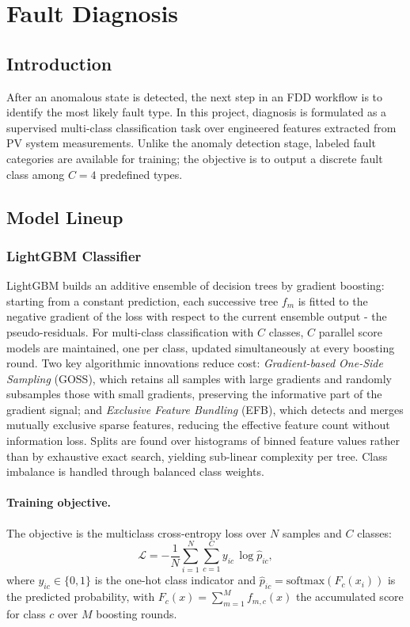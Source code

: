 \section{Fault Diagnosis}\label{sec:fault-diagnosis}

\subsection{Introduction}
After an anomalous state is detected, the next step in an FDD workflow is to identify the most likely fault type. In this project, diagnosis is formulated as a supervised multi-class classification task over engineered features extracted from PV system measurements. Unlike the anomaly detection stage, labeled fault categories are available for training; the objective is to output a discrete fault class among $C=4$ predefined types.


\subsection{Model Lineup}

\subsubsection{LightGBM Classifier}

LightGBM builds an additive ensemble of decision trees by gradient boosting: starting from a constant prediction, each successive tree $f_m$ is fitted to the negative gradient of the loss with respect to the current ensemble output - the pseudo-residuals. For multi-class classification with $C$ classes, $C$ parallel score models are maintained, one per class, updated simultaneously at every boosting round. Two key algorithmic innovations reduce cost: \emph{Gradient-based One-Side Sampling} (GOSS), which retains all samples with large gradients and randomly subsamples those with small gradients, preserving the informative part of the gradient signal; and \emph{Exclusive Feature Bundling} (EFB), which detects and merges mutually exclusive sparse features, reducing the effective feature count without information loss. Splits are found over histograms of binned feature values rather than by exhaustive exact search, yielding sub-linear complexity per tree. Class imbalance is handled through balanced class weights.

\paragraph{Training objective.}
The objective is the multiclass cross-entropy loss over $N$ samples and $C$ classes:
\begin{equation}
    \mathcal{L} = -\frac{1}{N}\sum_{i=1}^{N}\sum_{c=1}^{C} y_{ic}\,\log\hat{p}_{ic},
\end{equation}
where $y_{ic}\in\{0,1\}$ is the one-hot class indicator and $\hat{p}_{ic} = \text{softmax}(F_c(x_i))$ is the predicted probability, with $F_c(x) = \sum_{m=1}^{M} f_{m,c}(x)$ the accumulated score for class $c$ over $M$ boosting rounds.

